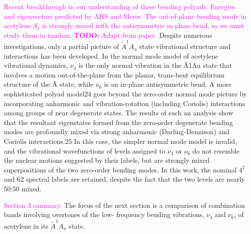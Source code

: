 \documentclass[12pt,draft]{mitthesis}
\newcommand{\TODO} [1]{\textcolor{magenta}{\textbf{TODO:} #1}}
\newcommand{\POINT}[1]{\textcolor{magenta}{#1}}
\begin{document}
\POINT{Recent breakthrough in our understanding of these bending
  polyads.  Energies and eigenvectors predicted by AHS and Merer.  The
  out-of-plane bending mode in acetylene $S_1$ is strongly mixed with
  the antisymmetric in-plane bend, so we must study them in tandem.}
\TODO{Adapt from paper.}  Despite numerous investigations, only a
partial picture of $\tilde{A} ^1A_u$ state vibrational structure and
interactions has been developed.  In the normal mode model of
acetylene vibrational dynamics, $\nu_4$ is the only normal vibration
in the Ã1Au state that involves a motion out-of-the-plane from the
planar, trans-bent equilibrium structure of the Ã state, while $\nu_6$ is
an in-plane antisymmetric bend. A more sophisticated polyad model24
goes beyond the zero-order normal mode picture by incorporating
anharmonic and vibration-rotation (including Coriolis) interactions
among groups of near degenerate states. The results of such an
analysis show that the resultant eigenstates formed from the
zero-order degenerate bending modes are profoundly mixed via strong
anharmonic (Darling-Dennison) and Coriolis interactions.25 In this
case, the simpler normal mode model is invalid, and the vibrational
wavefunctions of levels assigned to $\nu_4$ or $\nu_6$ do not resemble the
nuclear motions suggested by their labels, but are strongly mixed
superpositions of the two zero-order bending modes.  In this work, the
nominal $4^2$ and 62 spectral labels are retained, despite the fact
that the two levels are nearly 50:50 mixed.

\POINT{Section 3 summary.}  The focus of the next section is a
comparison of combination bands involving overtones of the low-
frequency bending vibrations, $\nu_4$ and $\nu_6$, of acetylene in its
$\tilde{A} ^1A_u$ state.
\end{document}
